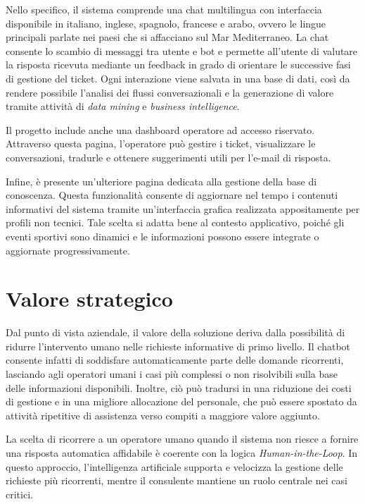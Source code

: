 Nello specifico, il sistema comprende una chat multilingua con interfaccia disponibile in italiano, inglese, spagnolo, francese e arabo, ovvero le lingue principali parlate nei paesi che si affacciano sul Mar Mediterraneo. La chat consente lo scambio di messaggi tra utente e bot e permette all’utente di valutare la risposta ricevuta mediante un feedback in grado di orientare le successive fasi di gestione del ticket. Ogni interazione viene salvata in una base di dati, così da rendere possibile l’analisi dei flussi conversazionali e la generazione di valore tramite attività di \textit{data mining} e \textit{business intelligence}.

Il progetto include anche una dashboard operatore ad accesso riservato. Attraverso questa pagina, l’operatore può gestire i ticket, visualizzare le conversazioni, tradurle e ottenere suggerimenti utili per l’e-mail di risposta.

Infine, è presente un’ulteriore pagina dedicata alla gestione della base di conoscenza. Questa funzionalità consente di aggiornare nel tempo i contenuti informativi del sistema tramite un’interfaccia grafica realizzata appositamente per profili non tecnici. Tale scelta si adatta bene al contesto applicativo, poiché gli eventi sportivi sono dinamici e le informazioni possono essere integrate o aggiornate progressivamente.

\section{Valore strategico}

Dal punto di vista aziendale, il valore della soluzione deriva dalla possibilità di ridurre l’intervento umano nelle richieste informative di primo livello. Il chatbot consente infatti di soddisfare automaticamente parte delle domande ricorrenti, lasciando agli operatori umani i casi più complessi o non risolvibili sulla base delle informazioni disponibili. Inoltre, ciò può tradursi in una riduzione dei costi di gestione e in una migliore allocazione del personale, che può essere spostato da attività ripetitive di assistenza verso compiti a maggiore valore aggiunto.

La scelta di ricorrere a un operatore umano quando il sistema non riesce a fornire una risposta automatica affidabile è coerente con la logica \textit{Human-in-the-Loop}. In questo approccio, l’intelligenza artificiale supporta e velocizza la gestione delle richieste più ricorrenti, mentre il consulente mantiene un ruolo centrale nei casi critici.

